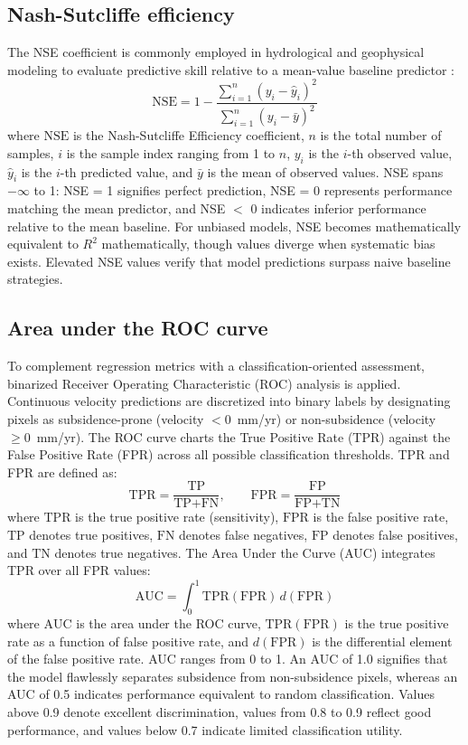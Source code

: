 \documentclass[oneside,doublespacing,flushright]{lsuthesis}
\begin{document}
\subsection{Nash-Sutcliffe efficiency}
The NSE coefficient is commonly employed in hydrological and geophysical modeling to evaluate predictive skill relative to a mean-value baseline predictor \citep{Nash1970}:
\begin{equation}
\text{NSE} = 1 - \frac{\sum_{i=1}^{n}(y_i - \hat{y}_i)^2}{\sum_{i=1}^{n}(y_i - \bar{y})^2}
\end{equation}
where $\text{NSE}$ is the Nash-Sutcliffe Efficiency coefficient, $n$ is the total number of samples, $i$ is the sample index ranging from 1 to $n$, $y_i$ is the $i$-th observed value, $\hat{y}_i$ is the $i$-th predicted value, and $\bar{y}$ is 
the mean of observed values. NSE spans $-\infty$ to 1: NSE = 1 signifies perfect prediction, NSE = 0 represents performance matching the mean predictor, and NSE $<$ 0 indicates inferior performance relative to the mean baseline. 
For unbiased models, NSE becomes mathematically equivalent to $R^2$ mathematically, though values diverge when systematic bias exists. Elevated NSE values verify that model predictions surpass naive baseline strategies.

\subsection{Area under the ROC curve}
To complement regression metrics with a classification-oriented assessment, binarized Receiver Operating Characteristic (ROC) analysis is applied. Continuous velocity predictions are discretized into binary labels by designating pixels as subsidence-prone (velocity $< 0$~mm/yr) or non-subsidence (velocity $\geq 0$~mm/yr). The ROC curve charts the True Positive Rate (TPR) against the False Positive Rate (FPR) across all possible classification thresholds. TPR and FPR are defined as:
\begin{equation}
\text{TPR} = \frac{\text{TP}}{\text{TP} + \text{FN}}, \qquad \text{FPR} = \frac{\text{FP}}{\text{FP} + \text{TN}}
\end{equation}
where $\text{TPR}$ is the true positive rate (sensitivity), $\text{FPR}$ is the false positive rate, $\text{TP}$ denotes true positives, $\text{FN}$ denotes false negatives, $\text{FP}$ denotes false positives, and $\text{TN}$ denotes true negatives. The Area Under the Curve (AUC) integrates TPR over all FPR values:
\begin{equation}
\text{AUC} = \int_0^1 \text{TPR}(\text{FPR})\, d(\text{FPR})
\end{equation}
where $\text{AUC}$ is the area under the ROC curve, $\text{TPR}(\text{FPR})$ is the true positive rate as a function of false positive rate, and $d(\text{FPR})$ is the differential element of the false positive rate. 
AUC ranges from 0 to 1. An AUC of 1.0 signifies that the model flawlessly separates subsidence from non-subsidence pixels, whereas an AUC of 0.5 indicates performance equivalent to random classification. Values above 0.9 denote excellent discrimination, values from 0.8 to 0.9 reflect good performance, and values below 0.7 indicate limited classification utility.
\end{document}
